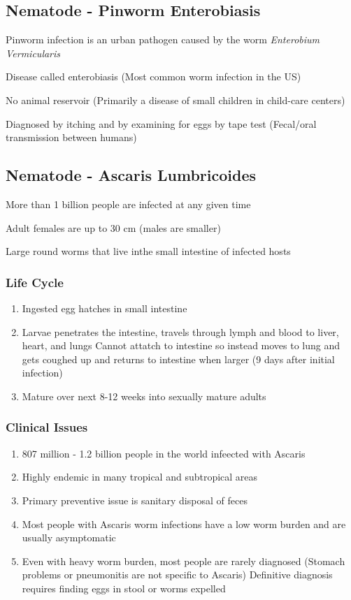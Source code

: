 \documentclass{notes}
\begin{document}
\subsection*{Nematode - Pinworm Enterobiasis}
Pinworm infection is an urban pathogen caused by the worm \textit{Enterobium Vermicularis}

Disease called enterobiasis (Most common worm infection in the US)

No animal reservoir (Primarily a disease of small children in child-care centers)

Diagnosed by itching and by examining for eggs by tape test (Fecal/oral transmission between humans)

\subsection*{Nematode - Ascaris Lumbricoides}
More than 1 billion people are infected at any given time

Adult females are up to 30 cm (males are smaller)

Large round worms that live inthe small intestine of infected hosts

\subsubsection*{Life Cycle}
\begin{enumerate}
    \item Ingested egg hatches in small intestine
    \item Larvae penetrates the intestine, travels through lymph and blood to liver, heart, and lungs
    \subitem Cannot attatch to intestine so instead moves to lung and gets coughed up and returns to intestine when larger (9 days after initial infection)
    \item Mature over next 8-12 weeks into sexually mature adults
\end{enumerate}

\subsubsection*{Clinical Issues}
\begin{enumerate}
    \item 807 million - 1.2 billion people in the world infeected with Ascaris
    \item Highly endemic in many tropical and subtropical areas
    \item Primary preventive issue is sanitary disposal of feces
    \item Most people with Ascaris worm infections have a low worm burden and are usually asymptomatic
    \item Even with heavy worm burden, most people are rarely diagnosed (Stomach problems or pneumonitis are not specific to Ascaris)
    \subitem Definitive diagnosis requires finding eggs in stool or worms expelled
\end{enumerate}
\end{document}
